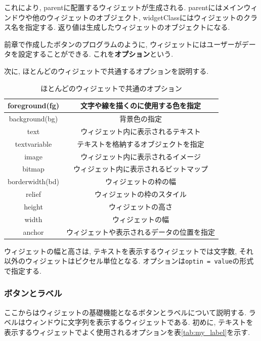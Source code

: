 \documentclass[dvipdfmx]{jsarticle}
\begin{document}
これにより, parentに配置するウィジェットが生成される.
parentにはメインウィンドウや他のウィジェットのオブジェクト, widgetClassにはウィジェットのクラス名を指定する.
返り値は生成したウィジェットのオブジェクトになる.

前章で作成したボタンのプログラムのように, ウィジェットにはユーザーがデータを設定することができる.
これを\textbf{オプション}という.

次に, ほとんどのウィジェットで共通するオプションを説明する.

\begin{table}[H]
    \centering
    \begin{tabular}{|c|c|}
    \hline
    foreground(fg)	& 文字や線を描くのに使用する色を指定 \\
    \hline
    background(bg)	& 背景色の指定 \\
    \hline
    text	& ウィジェット内に表示されるテキスト \\
    \hline
    textvariable	& テキストを格納するオブジェクトを指定 \\
    \hline
    image	& ウィジェット内に表示されるイメージ \\
    \hline
    bitmap	& ウィジェット内に表示されるビットマップ \\
    \hline
    borderwidth(bd)	& ウィジェットの枠の幅 \\
    \hline
    relief	& ウィジェットの枠のスタイル \\
    \hline
    height	& ウィジェットの高さ \\
    \hline
    width	& ウィジェットの幅 \\
    \hline
    
    anchor	& ウィジェットや表示されるデータの位置を指定 \\
    \hline
    
    \end{tabular}
    \caption{ほとんどのウィジェットで共通のオプション}
    \label{option}
\end{table}

ウィジェットの幅と高さは, テキストを表示するウィジェットでは文字数, それ以外のウィジェットはピクセル単位となる.
オプションは\verb|optin = value|の形式で指定する.

\subsubsection{ボタンとラベル}
ここからはウィジェットの基礎機能となるボタンとラベルについて説明する.
ラベルはウィンドウに文字列を表示するウィジェットである.
初めに, テキストを表示するウィジェットでよく使用されるオプションを表\ref{tab:my_label}を示す.
\end{document}
